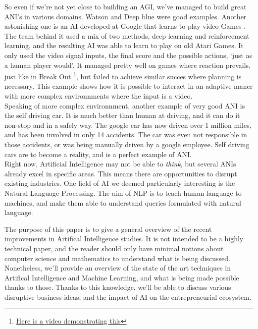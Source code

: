 \documentclass[12pt]{article}
\begin{document}
So even if we're not yet close to building an AGI, we've managed to build great
ANI's in various domains. Watson and Deep blue were good examples. Another
astonishing one is an AI developed at Google that learns to play video Games
\cite{Atari}. The team behind it used a mix of two methods, deep learning and
reinforcement learning, and the resulting AI
was able to learn to play on old Atari Games. It only used the video signal
inputs, the final score and the possible actions, \lq just as a human player
would\rq. It managed pretty well on games where reaction prevails, just like in
Break Out \footnote{\href{https://www.youtube.com/watch?v=cjpEIotvwFY}
{Here is a video demonstrating this}}, but failed to achieve similar succes
where planning is necessary. This example shows how it is possible to interact
in an adaptive maner with more complex environnments where the input is a video.
\\

Speaking of more complex environnment, another example of very good ANI is the
self driving car. It is much better than human at driving, and it can do it
non-stop and in a safely way. The google car has now driven over 1 million miles,
and has been involved in only 14 accidents. The car was even not responsible in
those accidents, or was being manually driven by a google employee. Self driving
cars are to become a reality, and is a perfect example of ANI.
\\

Right now, Artificial Intelligence may not be able to {\em think}, but several
ANIs already excel in specific areas. This means there are opportunities to
disrupt existing industries. One field of AI we deemed particularly interesting
is the Natural Language Processing. The aim of NLP is to teach human language to
machines, and make them able to understand queries formulated with natural
language.



The purpose of this paper is to give a general overview of the recent
improvements in Artifical Intelligence studies. It is not intended to be a
highly technical paper, and the reader should only have minimal notions about
computer science and mathematics to understand what is being discussed.
Nonetheless, we'll provide an overview of the state of the art
techniques in Artifical Intelligence and Machine Learning, and what is being
made possible thanks to those. Thanks to this knowledge, we'll be able to
discuss various disruptive business ideas, and the impact of AI on the
entrepreneurial ecosystem.
\\
\end{document}
